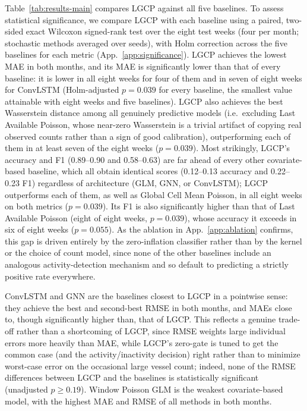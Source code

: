 Table~\ref{tab:results-main} compares LGCP against all five baselines. To assess statistical significance, we compare LGCP with each baseline using a paired, two-sided exact Wilcoxon signed-rank test over the eight test weeks (four per month; stochastic methods averaged over seeds), with Holm correction across the five baselines for each metric (App.~\ref{app:significance}). LGCP achieves the lowest MAE in both months, and its MAE is significantly lower than that of every baseline: it is lower in all eight weeks for four of them and in seven of eight weeks for ConvLSTM (Holm-adjusted $p=0.039$ for every baseline, the smallest value attainable with eight weeks and five baselines). LGCP also achieves the best Wasserstein distance among all genuinely predictive models (i.e.\ excluding Last Available Poisson, whose near-zero Wasserstein is a trivial artifact of copying real observed counts rather than a sign of good calibration), outperforming each of them in at least seven of the eight weeks ($p=0.039$). Most strikingly, LGCP's accuracy and F1 (0.89--0.90 and 0.58--0.63) are far ahead of every other covariate-based baseline, which all obtain identical scores (0.12--0.13 accuracy and 0.22--0.23 F1) regardless of architecture (GLM, GNN, or ConvLSTM); LGCP outperforms each of them, as well as Global Cell Mean Poisson, in all eight weeks on both metrics ($p=0.039$). Its F1 is also significantly higher than that of Last Available Poisson (eight of eight weeks, $p=0.039$), whose accuracy it exceeds in six of eight weeks ($p=0.055$). As the ablation in App.~\ref{app:ablation} confirms, this gap is driven entirely by the zero-inflation classifier rather than by the kernel or the choice of count model, since none of the other baselines include an analogous activity-detection mechanism and so default to predicting a strictly positive rate everywhere.

ConvLSTM and GNN are the baselines closest to LGCP in a pointwise sense: they achieve the best and second-best RMSE in both months, and MAEs close to, though significantly higher than, that of LGCP. This reflects a genuine trade-off rather than a shortcoming of LGCP, since RMSE weights large individual errors more heavily than MAE, while LGCP's zero-gate is tuned to get the common case (and the activity/inactivity decision) right rather than to minimize worst-case error on the occasional large vessel count; indeed, none of the RMSE differences between LGCP and the baselines is statistically significant (unadjusted $p\ge0.19$). Window Poisson GLM is the weakest covariate-based model, with the highest MAE and RMSE of all methods in both months.
